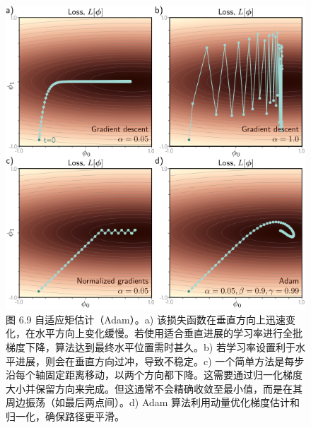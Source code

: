 \begin{figure}[ht!]
\centering
\includegraphics[width=0.7\linewidth]{png/chapter6/TrainADAM.png}
\caption{图 6.9 自适应矩估计（Adam）。a) 该损失函数在垂直方向上迅速变化，在水平方向上变化缓慢。若使用适合垂直进展的学习率进行全批梯度下降，算法达到最终水平位置需时甚久。b) 若学习率设置利于水平进展，则会在垂直方向过冲，导致不稳定。c) 一个简单方法是每步沿每个轴固定距离移动，以两个方向都下降。这需要通过归一化梯度大小并保留方向来完成。但这通常不会精确收敛至最小值，而是在其周边振荡（如最后两点间）。d) Adam 算法利用动量优化梯度估计和归一化，确保路径更平滑。}
\end{figure}